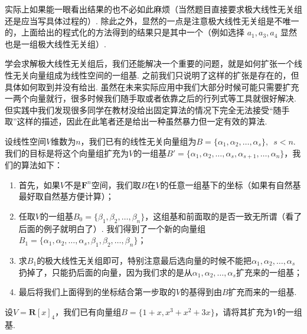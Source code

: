 实际上如果能一眼看出结果的也不必如此麻烦（当然题目直接要求极大线性无关组还是应当写具体过程的）. 除此之外，显然的一点是注意极大线性无关组是不唯一的，上面给出的程式化的方法得到的结果只是其中一个（例如选择 $a_1,a_3,a_4$ 显然也是一组极大线性无关组）.

学会求解极大线性无关组后，我们还能解决一个重要的问题，就是如何扩张一个线性无关向量组成为线性空间的一组基. 之前我们只说明了这样的扩张是存在的，但具体如何取到并没有给出. 虽然在未来实际应用中我们大部分时候可能只需要扩充一两个向量就行，很多时候我们随手取或者依靠之后的行列式等工具就很好解决. 但实践中我们发现很多同学在教材没给出固定算法的情况下完全无法接受``随手取''这样的描述，因此在此笔者还是给出一种虽然暴力但一定有效的算法.

设线性空间$V$维数为$n$，我们已有的线性无关向量组为$B=\{\alpha_1,\alpha_2,\ldots,\alpha_s\},\enspace s<n$. 我们的目标是将这个向量组扩充为$V$的一组基$B'=\{\alpha_1,\alpha_2,\ldots,\alpha_s,\alpha_{s+1},\ldots,\alpha_n\}$，我们的算法如下：
\begin{enumerate}
    \item 首先，如果$V$不是$\mathbf{F}^n$空间，我们取$B$在$V$的任意一组基下的坐标（如果有自然基最好取自然基方便计算）；

    \item 任取$V$的一组基$B_0=\{\beta_1,\beta_2,\ldots,\beta_n\}$，这组基和前面取的是否一致无所谓（看了后面的例子就明白了）. 我们得到了一个新的向量组$B_1=\{\alpha_1,\alpha_2,\ldots,\alpha_s,\beta_1,\beta_2,\ldots,\beta_n\}$；

    \item 求$B_1$的极大线性无关组即可，特别注意最后选向量的时候不能把$\alpha_1,\alpha_2,\ldots,\alpha_s$扔掉了，只能扔后面的向量，因为我们求的是从$\alpha_1,\alpha_2,\ldots,\alpha_s$扩充来的一组基；

    \item 最后将我们上面得到的坐标结合第一步取的$V$的基得到由$B$扩充而来的一组基.
\end{enumerate}

\begin{example}{}{}
    设$V=\mathbf{R}[x]_4$，我们已有向量组$B=\{1+x,x^3+x^2+3x\}$，请将其扩充为$V$的一组基.
\end{example}

